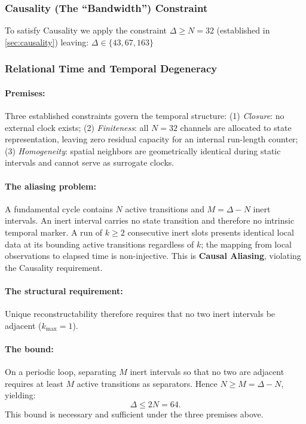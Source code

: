\subsubsection{Causality (The ``Bandwidth'') Constraint}
\label{sec:fundamental_resonance_filter2}
To satisfy Causality we apply the constraint \linebreak $\Delta \ge N = 32$ (established in \cref{sec:causality}) leaving: $\Delta \in \{43, 67, 163\}$



\subsubsection{Relational Time and Temporal Degeneracy}
\label{sec:relational_time_constraint}

\paragraph{Premises:} Three established constraints govern the temporal structure: (1) \textit{Closure}: no external clock exists; (2) \textit{Finiteness}: all $N=32$ channels are allocated to state representation, leaving zero residual capacity for an internal run-length counter; (3) \textit{Homogeneity}: spatial neighbors are geometrically identical during static intervals and cannot serve as surrogate clocks.

\paragraph{The aliasing problem:} A fundamental cycle contains $N$ active transitions and $M = \Delta - N$ inert intervals. An inert interval carries no state transition and therefore no intrinsic temporal marker. A run of $k \geq 2$ consecutive inert slots presents identical local data at its bounding active transitions regardless of $k$; the mapping from local observations to elapsed time is non-injective. This is \textbf{Causal Aliasing}, violating the Causality requirement.

\paragraph{The structural requirement:} Unique reconstructability therefore requires that no two inert intervals be adjacent ($k_{\max} = 1$).

\paragraph{The bound:} On a periodic loop, separating $M$ inert intervals so that no two are adjacent requires at least $M$ active transitions as separators. Hence $N \geq M = \Delta - N$, yielding:
\begin{equation}
    \Delta \leq 2N = 64 .
\end{equation}
This bound is necessary and sufficient under the three premises above.

